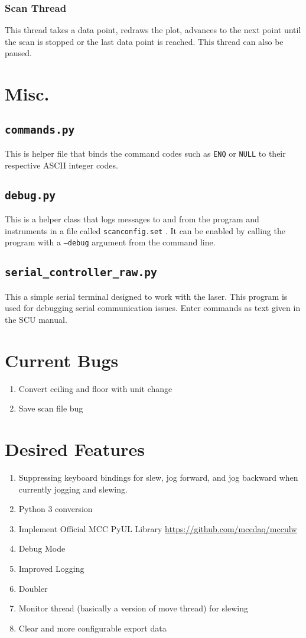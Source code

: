 \documentclass[11pt]{article}
\begin{document}
\subsubsection{Scan Thread}
This thread takes a data point, redraws the plot, advances to the next point until the scan is stopped or the last data point is reached. This thread can also be paused. 

\section{Misc.}
\subsection{\texttt{commands.py}}
This is helper file that binds the command codes such as \texttt{ENQ} or \texttt{NULL} to their respective ASCII integer codes.
\subsection{\texttt{debug.py}}
This is a helper class that logs messages to and from the program and instruments in a file called \texttt{scan\textunderscore config.set} . It can be enabled by calling the program with a \texttt{--debug} argument from the command line.
\subsection{\texttt{serial\_controller\_raw.py}}
This a simple serial terminal designed to work with the laser. This program is used for debugging serial communication issues. Enter commands as text given in the SCU manual.
\section{Current Bugs}
\begin{enumerate}
    \item Convert ceiling and floor with unit change
    \item Save scan file bug 
\end{enumerate}
\section{Desired Features}
\begin{enumerate}
    \item Suppressing keyboard bindings for slew, jog forward, and jog backward when currently jogging and slewing.
    \item Python 3 conversion 
    \item Implement Official MCC PyUL Library \url{https://github.com/mccdaq/mcculw}
    \item Debug Mode
    \item Improved Logging 
    \item Doubler 
    \item Monitor thread (basically a version of move thread) for slewing
    \item Clear and more configurable export data
\end{enumerate}
\end{document}
